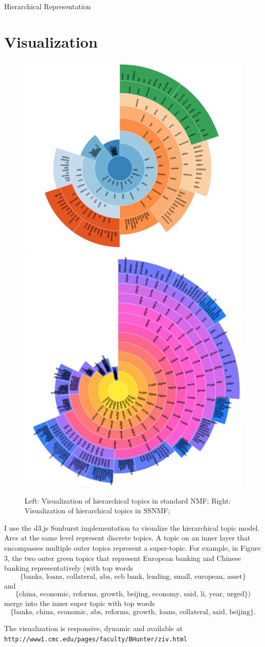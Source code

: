 \documentclass[12pt]{pom_thesis}
\begin{document}
\begin{chapter}{Hierarchical Representation}
\section{Visualization}
\begin{figure}
	\centering
	\includegraphics[width=.48\textwidth]{img}
	\includegraphics[width=.48\textwidth]{img2}
	\caption{Left: Visualization of hierarchical topics in standard NMF; Right: Visualization of hierarchical topics in  SSNMF; }
\end{figure}
I use the d3.js Sunburst implementation to visualize the hierarchical topic model. Arcs at the same level represent discrete topics. A topic on an inner layer that encompasses multiple outer topics represent a super-topic. For example, in Figure 3, the two outer green topics that represent European banking and Chinese banking representatively (with top words$$ \{\text{banks, loans, collateral, abs, ecb bank, lending, small, european, asset}\} $$and $$\{\text{china, economic, reforms, growth, beijing, economy, said, li, year, urged}\}) $$merge into the inner super topic with top words$$ \{\text{banks, china, economic, abs, reforms, growth, loans, collateral, said, beijing}\}.$$

The visualization is responsive, dynamic and available at \\ \texttt{http://www1.cmc.edu/pages/faculty/BHunter/ziv.html}


\end{chapter}
\end{document}
